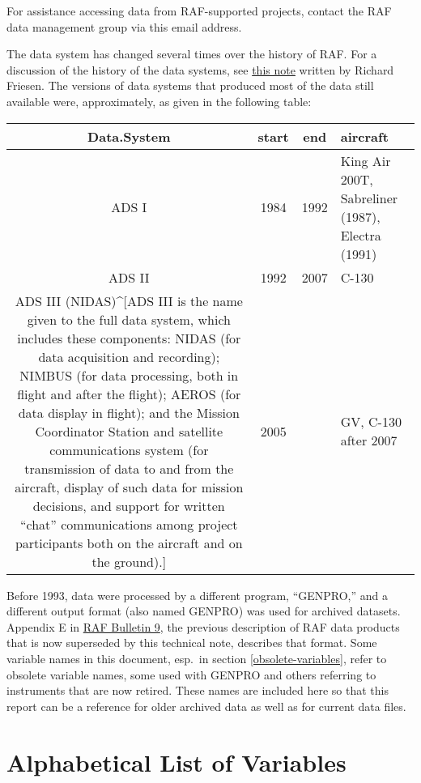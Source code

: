 \documentclass[
  english,
]{book}
\begin{document}
For assistance accessing data from RAF-supported projects, contact the RAF data management group via this email address.

The data system has changed several times over the history of RAF. For a discussion of the history of the data systems, see \href{https://github.com/NCAR/aircraft_ProcessingAlgorithms/blob/master/www/ADSHistory.pdf}{this note} written by Richard Friesen. The versions of data systems that produced most of the data still available were, approximately, as given in the following table:

\begin{table}
\centering
\begin{tabular}{c|c|c|l}
\hline
Data.System & start & end & aircraft\\
\hline
ADS I & 1984 & 1992 & King Air 200T, Sabreliner (1987), Electra (1991)\\
\hline
ADS II & 1992 & 2007 & C-130\\
\hline
ADS III (NIDAS)\textasciicircum{}[ADS III is the name given to the full data system, which includes these components: NIDAS (for data acquisition and recording); NIMBUS (for data processing, both in flight and after the flight); AEROS (for data display in flight); and the Mission Coordinator Station and satellite communications system (for transmission of data to and from the aircraft, display of such data for mission decisions, and support for written “chat” communications among project participants both on the aircraft and on the ground).] & 2005 &  & GV, C-130 after 2007\\
\hline
\end{tabular}
\end{table}

Before 1993, data were processed by a different program, ``GENPRO,'' and a different output format (also named GENPRO) was used for archived datasets. Appendix E in \href{https://opensky.ucar.edu/islandora/object/archives\%3A8729}{RAF Bulletin 9}, the previous description of RAF data products that is now superseded by this technical note, describes that format. Some variable names in this document, esp.~in section \ref{obsolete-variables}, refer to obsolete variable names, some used with GENPRO and others referring to instruments that are now retired. These names are included here so that this report can be a reference for older archived data as well as for current data files.

\hypertarget{alphabetical-list-of-variables}{%
\section{Alphabetical List of Variables}\label{alphabetical-list-of-variables}}
\end{document}
